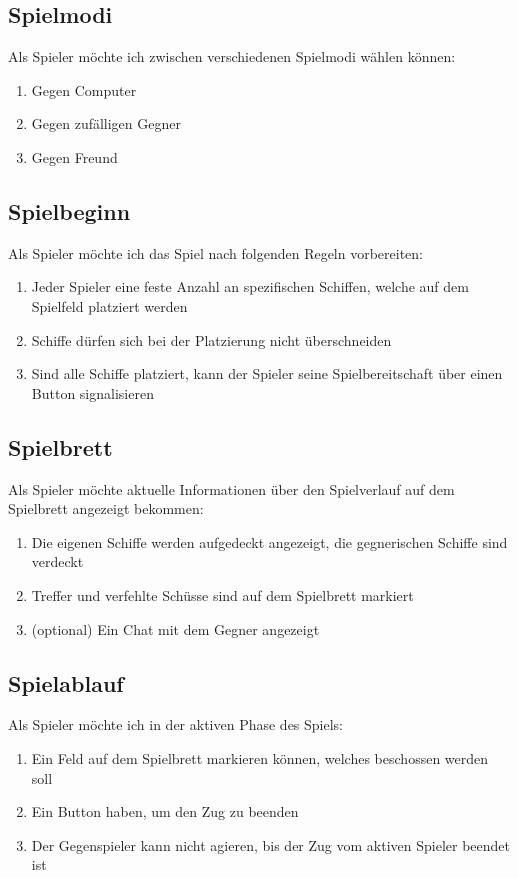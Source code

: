 \documentclass[a4paper, 10pt, conference]{IEEEtran}
\begin{document}
\subsection{Spielmodi}
Als Spieler möchte ich zwischen verschiedenen Spielmodi wählen können:
\begin{enumerate}
	\item Gegen Computer
	\item Gegen zufälligen Gegner
	\item Gegen Freund
\end{enumerate}

\subsection{Spielbeginn}
Als Spieler möchte ich das Spiel nach folgenden Regeln vorbereiten:
\begin{enumerate}
	\item Jeder Spieler eine feste Anzahl an spezifischen Schiffen, welche auf dem Spielfeld platziert werden
	\item Schiffe dürfen sich bei der Platzierung nicht überschneiden
	\item Sind alle Schiffe platziert, kann der Spieler seine Spielbereitschaft über einen Button signalisieren
\end{enumerate}

\subsection{Spielbrett}
Als Spieler möchte aktuelle Informationen über den Spielverlauf auf dem Spielbrett angezeigt bekommen:
\begin{enumerate}
	\item Die eigenen Schiffe werden aufgedeckt angezeigt, die gegnerischen Schiffe sind verdeckt
	\item Treffer und verfehlte Schüsse sind auf dem Spielbrett markiert
	\item (optional) Ein Chat mit dem Gegner angezeigt
\end{enumerate}

\subsection{Spielablauf}
Als Spieler möchte ich in der aktiven Phase des Spiels:
\begin{enumerate}
	\item Ein Feld auf dem Spielbrett markieren können, welches beschossen werden soll
	\item Ein Button haben, um den Zug zu beenden
	\item Der Gegenspieler kann nicht agieren, bis der Zug vom aktiven Spieler beendet ist
\end{enumerate}
\end{document}
